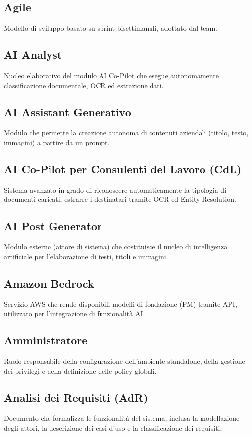 \documentclass[a4paper,12pt]{article}
\begin{document}
\subsection{Agile}
Modello di sviluppo basato su sprint bisettimanali, adottato dal team.

\subsection{AI Analyst}
Nucleo elaborativo del modulo AI Co-Pilot che esegue autonomamente classificazione documentale, OCR ed estrazione dati.

\subsection{AI Assistant Generativo}
Modulo che permette la creazione autonoma di contenuti aziendali (titolo, testo, immagini) a partire da un prompt.

\subsection{AI Co-Pilot per Consulenti del Lavoro (CdL)}
Sistema avanzato in grado di riconoscere automaticamente la tipologia di documenti caricati, estrarre i destinatari tramite OCR ed Entity Resolution.

\subsection{AI Post Generator}
Modulo esterno (attore di sistema) che costituisce il nucleo di intelligenza artificiale per l'elaborazione di testi, titoli e immagini.

\subsection{Amazon Bedrock}
Servizio AWS che rende disponibili modelli di fondazione (FM) tramite API, utilizzato per l'integrazione di funzionalità AI.

\subsection{Amministratore}
Ruolo responsabile della configurazione dell'ambiente standalone, della gestione dei privilegi e della definizione delle policy globali.

\subsection{Analisi dei Requisiti (AdR)}
Documento che formalizza le funzionalità del sistema, inclusa la modellazione degli attori, la descrizione dei casi d'uso e la classificazione dei requisiti.
\end{document}
